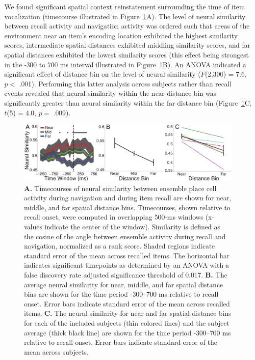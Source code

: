 We found significant spatial context reinstatement surrounding the time of item vocalization (timecourse illustrated in Figure~\ref{fig:reinstate}A). The level of neural similarity between recall activity and navigation activity was ordered such that areas of the environment near  an item's encoding location exhibited the highest similarity scores, intermediate spatial distances exhibited middling similarity scores, and far spatial distances exhibited the lowest similarity scores (this effect being strongest in the -300 to 700 ms interval illustrated in Figure~\ref{fig:reinstate}B).  An ANOVA indicated a significant effect of distance bin on the level of neural similarity ($F$(2,300) = 7.6, $p <$ .001). Performing this latter analysis across subjects rather than recall events revealed that neural similarity within the near distance bin was significantly greater than neural similarity within the far distance bin (Figure~\ref{fig:reinstate}C, $t$(5) = 4.0, $p =$ .009).   

\begin{figure}[t]
\centering
  \includegraphics[width=1\textwidth]{./tex/dboy/figs/fig3}
  \caption[Timecourse of neural similarity]{\textbf{A.} Timecourses of neural similarity between ensemble place cell activity during navigation and during item recall are shown for near, middle, and far spatial distance bins.  Timecourses, shown relative to recall onset, were  computed in overlapping 500-ms windows (x-values indicate the center of the window).  Similarity is defined as the cosine of the angle between ensemble activity during recall and navigation, normalized as a rank score. Shaded regions indicate standard error of the mean across recalled items. The horizontal bar indicates significant timepoints as determined by an ANOVA with a false discovery rate adjusted significance threshold of 0.017.  \textbf{B.} The average neural similarity for near, middle, and far spatial distance bins are shown for the time period -300--700 ms relative to recall onset. Error bars indicate standard error of the mean across recalled items.  \textbf{C.} The neural similarity for near and far spatial distance bins for each of the included subjects (thin colored lines) and the subject average (thick black line) are shown for the  time period -300--700 ms relative to recall onset. Error bars indicate standard error of the mean across subjects.}
\label{fig:reinstate}
\end{figure}

